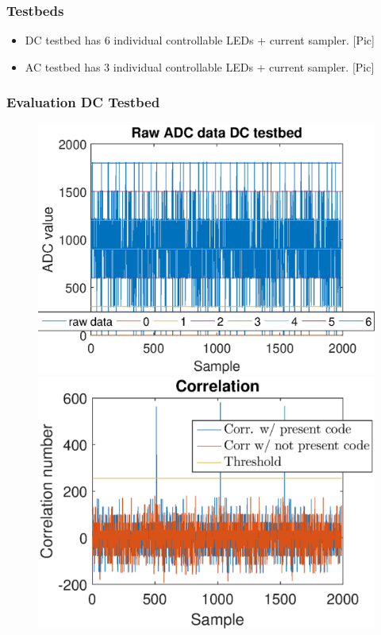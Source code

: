 \documentclass{beamer}
\begin{document}
	\begin{frame}\frametitle{Testbeds}
		

		\begin{itemize}

			\item DC testbed has 6 individual controllable LEDs + current sampler. [Pic]

			\item AC testbed has 3 individual controllable LEDs + current sampler. [Pic]

		\end{itemize}
	\end{frame}



	\begin{frame}\frametitle{Evaluation DC Testbed}

		\begin{figure}[!tbp]
		  \centering
		  \begin{minipage}[b]{0.49\textwidth}
		    \includegraphics[width=\textwidth]{../chapters/evaluation-chapters/hardware/dc/raw-dc-testbed-adc-data-n=9.eps}
		  \end{minipage}
		  \hfill
		  \begin{minipage}[b]{0.49\textwidth}
		    \includegraphics[width=\textwidth]{../chapters/evaluation-chapters/hardware/dc/correlation-dc-testbed-n=9.eps}

\end{minipage}
\end{figure}
\end{frame}
\end{document}
